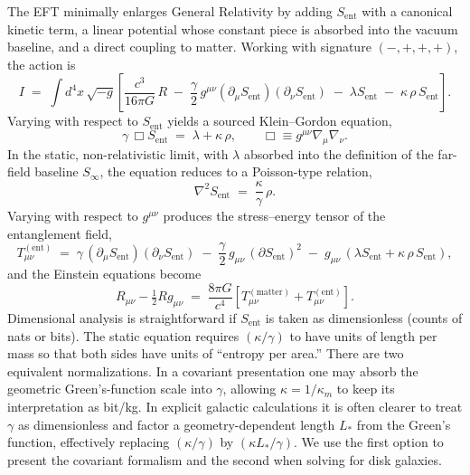\documentclass[11pt]{article}
\begin{document}
The EFT minimally enlarges General Relativity by adding $S_{\mathrm{ent}}$ with a canonical kinetic term, a linear potential whose constant piece is absorbed into the vacuum baseline, and a direct coupling to matter. Working with signature $(-,+,+,+)$, the action is
\begin{equation}
I \;=\; \int d^4x\, \sqrt{-g} \left[ \frac{c^3}{16\pi G}\, R \;-\; \frac{\gamma}{2}\, g^{\mu\nu} (\partial_\mu S_{\mathrm{ent}})(\partial_\nu S_{\mathrm{ent}}) \;-\; \lambda S_{\mathrm{ent}} \;-\; \kappa\, \rho\, S_{\mathrm{ent}} \right].
\end{equation}
Varying with respect to $S_{\mathrm{ent}}$ yields a sourced Klein–Gordon equation,
\begin{equation}
\gamma\, \Box S_{\mathrm{ent}} \;=\; \lambda + \kappa\, \rho,
\qquad \Box \equiv g^{\mu\nu} \nabla_\mu \nabla_\nu.
\end{equation}
In the static, non-relativistic limit, with $\lambda$ absorbed into the definition of the far-field baseline $S_\infty$, the equation reduces to a Poisson-type relation,
\begin{equation}
\nabla^2 S_{\mathrm{ent}} \;=\; \frac{\kappa}{\gamma}\, \rho.
\end{equation}
Varying with respect to $g^{\mu\nu}$ produces the stress–energy tensor of the entanglement field,
\begin{equation}
T^{(\mathrm{ent})}_{\mu\nu} \;=\; \gamma\, (\partial_\mu S_{\mathrm{ent}})(\partial_\nu S_{\mathrm{ent}}) \;-\; \frac{\gamma}{2}\, g_{\mu\nu}\, (\partial S_{\mathrm{ent}})^2 \;-\; g_{\mu\nu}\, (\lambda S_{\mathrm{ent}} + \kappa\, \rho\, S_{\mathrm{ent}}),
\end{equation}
and the Einstein equations become
\begin{equation}
R_{\mu\nu} - \tfrac{1}{2} R g_{\mu\nu} \;=\; \frac{8\pi G}{c^4} \left[ T^{(\mathrm{matter})}_{\mu\nu} + T^{(\mathrm{ent})}_{\mu\nu} \right].
\end{equation}
Dimensional analysis is straightforward if $S_{\mathrm{ent}}$ is taken as dimensionless (counts of nats or bits). The static equation requires $(\kappa/\gamma)$ to have units of length per mass so that both sides have units of “entropy per area.” There are two equivalent normalizations. In a covariant presentation one may absorb the geometric Green’s-function scale into $\gamma$, allowing $\kappa = 1/\kappa_m$ to keep its interpretation as bit/kg. In explicit galactic calculations it is often clearer to treat $\gamma$ as dimensionless and factor a geometry-dependent length $L_\ast$ from the Green’s function, effectively replacing $(\kappa/\gamma)$ by $(\kappa L_\ast/\gamma)$. We use the first option to present the covariant formalism and the second when solving for disk galaxies.
\end{document}

